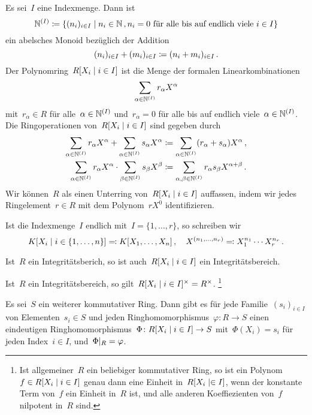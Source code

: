 Es sei~$I$ eine Indexmenge.
Dann ist
\[
  \Natural^{(I)}
  \defined
  \{
    ( n_i )_{i \in I}
  \suchthat
    n_i \in \Natural \,,
    \text{$n_i = 0$ für alle bis auf endlich viele~$i \in I$}
  \}
\]
ein abelsches Monoid bezüglich der Addition
\[
  ( n_i )_{i \in I}
  +
  ( m_i )_{i \in I}
  \coloneqq
  (n_i + m_i)_{i \in I} \,.
\]
Der Polynomring~$R[X_i \suchthat i \in I]$ ist die Menge der formalen Linearkombinationen
\[
  \sum_{\alpha \in \mathbb{N}^{(I)}} r_\alpha X^\alpha
\]
mit~$r_\alpha \in R$ für alle~$\alpha \in \mathbb{N}^{(I)}$ und~$r_\alpha = 0$ für alle bis auf endlich viele~$\alpha \in \mathbb{N}^{(I)}$.
Die Ringoperationen von~$R[X_i \suchthat i \in I]$ sind gegeben durch
\begin{align*}
  \sum_{\alpha \in \mathbb{N}^{(I)}} r_\alpha X^\alpha
  +
  \sum_{\alpha \in \mathbb{N}^{(I)}} s_\alpha X^\alpha
  &\coloneqq
  \sum_{\alpha \in \mathbb{N}^{(I)}} (r_\alpha + s_\alpha) X^\alpha \,,
  \\
  \sum_{\alpha \in \mathbb{N}^{(I)}} r_\alpha X^\alpha
  \cdot
  \sum_{\beta \in \mathbb{N}^{(I)}} s_\beta X^\beta
  &\coloneqq
  \sum_{\alpha, \beta \in \mathbb{N}^{(I)}} r_\alpha s_\beta X^{\alpha + \beta} \,.
\end{align*}
Wir können~$R$ als einen Unterring von~$R[X_i \suchthat i \in I]$ auffassen, indem wir jedes Ringelement~$r \in R$ mit dem  Polynom~$r X^0$ identifizieren.

Ist die Indexmenge~$I$ endlich mit~$I = \{ 1, \dotsc, r \}$, so schreiben wir
\[
  K[X_i \suchthat i \in \{1, \dotsc, n\}]
  \defines
  K[X_1, \dotsc, X_n] \,,
  \quad
  X^{(n_1, \dotsc, n_r)}
  \defines
  X_1^{n_1} \dotsm X_r^{n_r} \,.
\]

\begin{proposition}
  Ist~$R$ ein Integritätsberich, so ist auch~$R[X_i \suchthat i \in I]$ ein Integritätsbereich.
\end{proposition}

\begin{proposition}
  Ist~$R$ ein Integritätsbereich, so gilt~$R[X_i \suchthat i \in I]^\times = R^\times$.%
  \footnote{
    Ist allgemeiner~$R$ ein beliebiger kommutativer Ring, so ist ein Polynom~$f \in R[X_i \suchthat i \in I]$ genau dann eine Einheit in~$R[X_i \suchthat \in I]$, wenn der konstante Term von~$f$ ein Einheit in~$R$ ist, und alle anderen Koeffiezienten von~$f$ nilpotent in~$R$ sind.
  }
\end{proposition}

\begin{theorem}
  Es sei~$S$ ein weiterer kommutativer Ring.
  Dann gibt es für jede Familie~$(s_i)_{i \in I}$ von Elementen~$s_i \in S$ und jeden Ringhomomorphismus~$\varphi \colon R \to S$ einen eindeutigen Ringhomomorphismus~$\Phi \colon R[X_i \suchthat i \in I] \to S$ mit~$\Phi(X_i) = s_i$ für jeden  Index~$i \in I$, und~$\restrict{\Phi}{R} = \varphi$.
\end{theorem}

